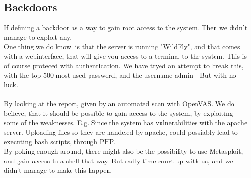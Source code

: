 \subsection{Backdoors}

If defining a backdoor as a way to gain root access to the system. Then we didn't manage to exploit any. \\
One thing we do know, is that the server is running "WildFly", and that comes with a webinterface, that will give you access to a terminal to the system. This is of course proteced with  authentication. We have tryed an attempt to break this, with the top 500 most used password, and the username admin - But with no luck. \\ \\
By looking at the report, given by an automated scan with OpenVAS. We do believe, that it should be possible to gain access to the system, by exploiting some of the weaknesses. E.g. Since the system has vulnerabilities with the apache server. Uploading files so they are handeled by apache, could possiably lead to executing bash scripts, through PHP. \\
By poking enough around, there might also be the possibility to use Metasploit, and gain access to a shell that way. But sadly time court up with us, and we didn't manage to make this happen.